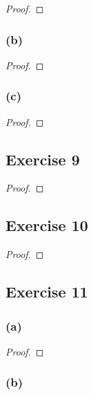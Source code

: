 \documentclass[14pt]{extarticle}
\begin{document}
\begin{proof}

\end{proof}

\subsubsection{(b)}

\begin{proof}

\end{proof}

\subsubsection{(c)}

\begin{proof}

\end{proof}

\subsection{Exercise 9}

\begin{proof}

\end{proof}

\subsection{Exercise 10}

\begin{proof}

\end{proof}

\subsection{Exercise 11}

\subsubsection{(a)}

\begin{proof}

\end{proof}

\subsubsection{(b)}
\end{document}

